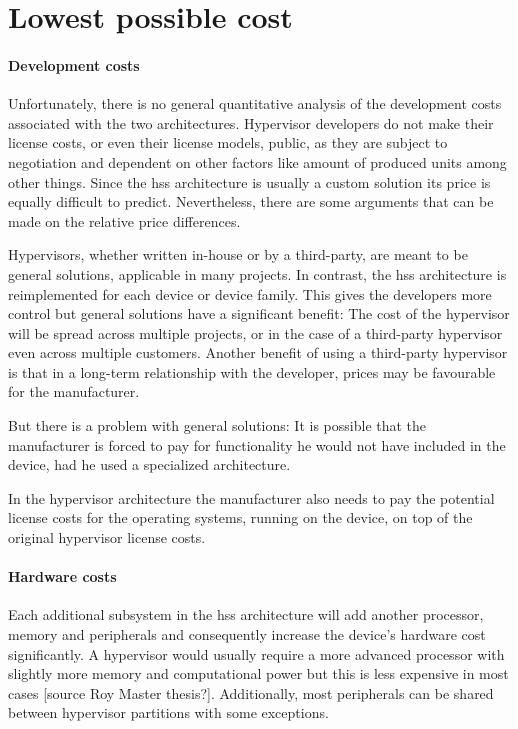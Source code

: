 
\section{Lowest possible cost}
\paragraph{Development costs}
Unfortunately, there is no general quantitative analysis of the development costs associated with the two architectures. Hypervisor developers do not make their license costs, or even their license models, public, as they are subject to negotiation and dependent on other factors like amount of produced units among other things. Since the \acrshort{hss} architecture is usually a custom solution its price is equally difficult to predict. Nevertheless, there are some arguments that can be made on the relative price differences. 

Hypervisors, whether written in-house or by a third-party, are meant to be general solutions, applicable in many projects. In contrast, the \acrshort{hss} architecture is reimplemented for each device or device family. This gives the developers more control but general solutions have a significant benefit: The cost of the hypervisor will be spread across multiple projects, or in the case of a third-party hypervisor even across multiple customers. Another benefit of using a third-party hypervisor is that in a long-term relationship with the developer, prices may be favourable for the manufacturer.

But there is a problem with general solutions: It is possible that the manufacturer is forced to pay for functionality he would not have included in the device, had he used a specialized architecture. 

In the hypervisor architecture the manufacturer also needs to pay the potential license costs for the operating systems, running on the device, on top of the original hypervisor license costs.

\paragraph{Hardware costs}
Each additional subsystem in the \acrshort{hss} architecture will add another processor, memory and peripherals and consequently increase the device's hardware cost significantly. A hypervisor would usually require a more advanced processor with slightly more memory and computational power but this is less expensive in most cases [source Roy Master thesis?]. Additionally, most peripherals can be shared between hypervisor partitions with some exceptions.

